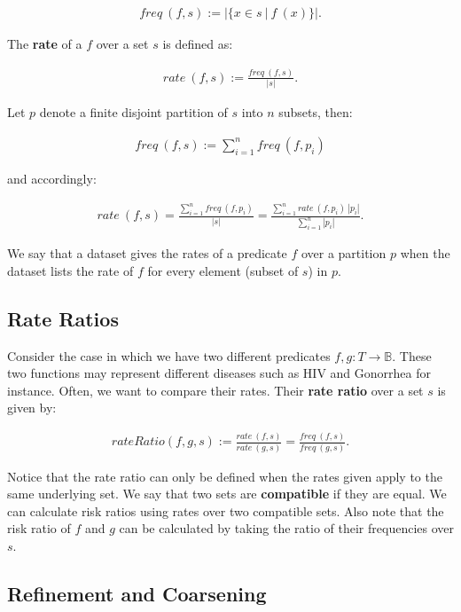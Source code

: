\documentclass[]{article}
\begin{document}
\begin{align*}
freq\ (f, s) := |\{x \in s\ |\ f\ (x)\}|.
\end{align*}

The \textbf{rate} of a \(f\) over a set \(s\) is defined as:

\begin{align*}
rate\ (f, s) := \frac{freq\ (f, s)}{|s|}.
\end{align*}

Let \(p\) denote a finite disjoint partition of \(s\) into \(n\)
subsets, then:

\begin{align*}
freq\ (f, s) := \sum_{i=1}^n freq\ (f, p_i)
\end{align*}

and accordingly:

\begin{align}
rate\ (f, s) = \frac{\sum_{i=1}^n freq\ (f, p_i)}{|s|} = \frac{\sum_{i=1}^n rate\ (f, p_i)\ |p_i|}{\sum_{i=1}^n|p_i|}.
\end{align}

We say that a dataset gives the rates of a predicate \(f\) over a
partition \(p\) when the dataset lists the rate of \(f\) for every
element (subset of \(s\)) in \(p\).

\hypertarget{rate-ratios}{%
\subsection{Rate Ratios}\label{rate-ratios}}

Consider the case in which we have two different predicates
\(f, g: T \rightarrow \mathbb{B}\). These two functions may represent
different diseases such as HIV and Gonorrhea for instance. Often, we
want to compare their rates. Their \textbf{rate ratio} over a set \(s\)
is given by:

\begin{align*}
rateRatio (f, g, s) := \frac{rate\ (f, s)}{rate\ (g, s)} = \frac{freq\ (f, s)}{freq\ (g, s)}.
\end{align*}

Notice that the rate ratio can only be defined when the rates given
apply to the same underlying set. We say that two sets are
\textbf{compatible} if they are equal. We can calculate risk ratios
using rates over two compatible sets. Also note that the risk ratio of
\(f\) and \(g\) can be calculated by taking the ratio of their
frequencies over \(s\).

\hypertarget{refinement-and-coarsening}{%
\subsection{Refinement and Coarsening}\label{refinement-and-coarsening}}
\end{document}

